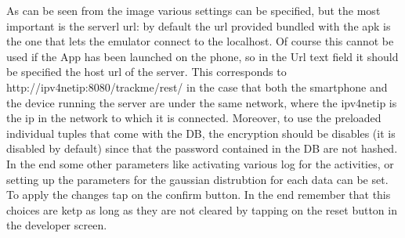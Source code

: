 As can be seen from the image various settings can be specified, but the most important is the serverl url: by default the url provided bundled with the apk is the one that lets the emulator connect to the localhost. Of course this cannot be used if the App has been launched on the phone, so in the Url text field it should be specified the host url of the server. This corresponds  to http://ipv4netip:8080/trackme/rest/ in the case that both the smartphone and the device running the server are under the same network, where the ipv4netip is the ip in the network to which it is connected.
Moreover, to use the preloaded individual tuples that come with the DB, the encryption should be disables (it is disabled by default) since that the password contained in the DB are not hashed.
In the end some other parameters like activating various log for the activities, or setting up the parameters for the gaussian distrubtion for each data can be set.
To apply the changes tap on the confirm button.
In the end remember that this choices are ketp as long as they are not cleared by tapping on the reset button in the developer screen.




